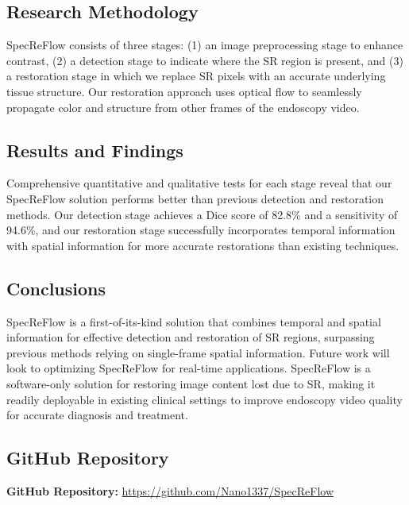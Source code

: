 \documentclass[12pt,letterpaper]{report}
\begin{document}
\subsection{Research Methodology}
SpecReFlow consists of three stages: (1) an image preprocessing stage to enhance contrast, (2) a detection stage to indicate where the SR region is present, and (3) a restoration stage in which we replace SR pixels with an accurate underlying tissue structure. Our restoration approach uses optical flow to seamlessly propagate color and structure from other frames of the endoscopy video.

\subsection{Results and Findings}
Comprehensive quantitative and qualitative tests for each stage reveal that our SpecReFlow solution performs better than previous detection and restoration methods. Our detection stage achieves a Dice score of 82.8\% and a sensitivity of 94.6\%, and our restoration stage successfully incorporates temporal information with spatial information for more accurate restorations than existing techniques.

\subsection{Conclusions}
SpecReFlow is a first-of-its-kind solution that combines temporal and spatial information for effective detection and restoration of SR regions, surpassing previous methods relying on single-frame spatial information. Future work will look to optimizing SpecReFlow for real-time applications. SpecReFlow is a software-only solution for restoring image content lost due to SR, making it readily deployable in existing clinical settings to improve endoscopy video quality for accurate diagnosis and treatment.

\subsection{GitHub Repository}
\textbf{GitHub Repository:} \url{https://github.com/Nano1337/SpecReFlow}


\end{document}
